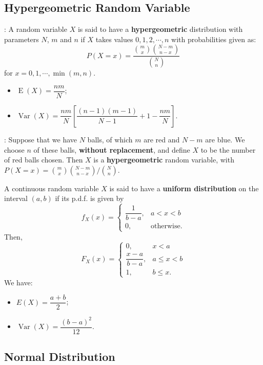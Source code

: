\subsection{Hypergeometric Random Variable}

: A random variable \(X\) is said to have a
\textbf{hypergeometric} distribution with parameters \(N\), \(m\) and \(n\) if
\(X\) takes values \(0, 1, 2, \cdots, n\) with probabilities given as:
\begin{equation*}
  P(X = x) = \dfrac{\binom{m}{x}\binom{N-m}{n-x}}{\binom{N}{n}}
\end{equation*}
for \(x = 0, 1, \cdots, \min(m, n)\).
\begin{itemize}
  \item \(\operatorname{E}\left(X\right)=\dfrac{nm}{N}\);
  \item \(\operatorname{Var}\left(X\right)=\dfrac{nm}{N}\left[
    \dfrac{(n-1)(m-1)}{N-1}+1 - \dfrac{nm}{N}
  \right]\).
\end{itemize}

: Suppose that we have $N$ balls, of which $m$ are red and 
$N-m$ are blue. We choose $n$ of these balls, \textbf{without replacement},
and define $X$ to be the number of red balls chosen. Then $X$ is a
\textbf{hypergeometric} random variable, with 
\(P(X = x) = {\binom{m}{x}\binom{N-m}{n-x}} / {\binom{N}{n}}\).


 A continuous random variable \(X\) is said to
have a
\textbf{uniform distribution} on the interval \((a, b)\) if its p.d.f. is given
by
\[f_X(x) = \begin{cases}
  \dfrac{1}{b-a}, & a < x < b \\
  0, & \text{otherwise}.
\end{cases}\]
Then, \[F_X(x) = \begin{cases}
  0, & x < a \\
  \dfrac{x-a}{b-a}, & a \leq x < b \\
  1, & b \leq x.
\end{cases}\]
We have:
\begin{multicols}{2}
  \begin{itemize}
    \item \(E(X) = \dfrac{a+b}{2}\);
    \item \(\operatorname{Var}(X) = \dfrac{(b-a)^2}{12}\).
  \end{itemize}
\end{multicols}

\subsection{Normal Distribution}

